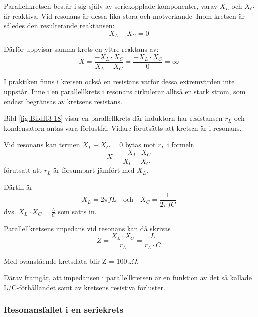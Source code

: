 Parallellkretsen består i sig själv av seriekopplade komponenter, varav
\(X_L\) och \(X_C\) är reaktiva.
Vid resonans är dessa lika stora och motverkande.
Inom kretsen är således den resulterande reaktansen:
\[ X_L - X_C = 0 \]

Därför uppvisar samma krets en yttre reaktans av:
\[
  X = \frac{-X_L \cdot X_C}{X_L - X_C}
  = \frac{-X_L \cdot X_C}{0}
  = \infty
\]

I praktiken finns i kretsen också en resistans varför dessa extremvärden inte
uppstår.
Inne i en parallellkrets i resonans cirkulerar alltså en stark ström,
som endast begränsas av kretsens resistans.

Bild \ref{fig:BildII3-18} visar en parallellkrets där induktorn har resistansen
\(r_L\) och kondensatorn antas vara förlustfri.
Vidare förutsätts att kretsen är i resonans.

Vid resonans kan termen \(X_L - X_C = 0\) bytas mot \(r_L\) i formeln
\[X = \frac{-X_L \cdot X_C}{X_L - X_C}\] 
förutsatt att \(r_L\) är försumbart jämfört med \(X_L\).

Därtill är 
\[
X_L = 2\pi fL \quad\text{och}\quad X_C = \frac{1}{2\pi fC}
\] dvs. \(X_L \cdot X_C = \frac{L}{C}\) som sätts in.

Parallellkretsens impedans vid resonans kan då skrivas
\[
Z = \frac{X_L \cdot X_C}{r_L} = \frac{L}{r_L \cdot C}
\]

Med ovanstående kretsdata blir Z = 100\,k\(\Omega\).

Därav framgår, att impedansen i parallellkretsen är en funktion av det så
kallade L/C-förhållandet samt av kretsens resistiva förluster.

\subsubsection{Resonansfallet i en seriekrets}
\label{serieresonans}

